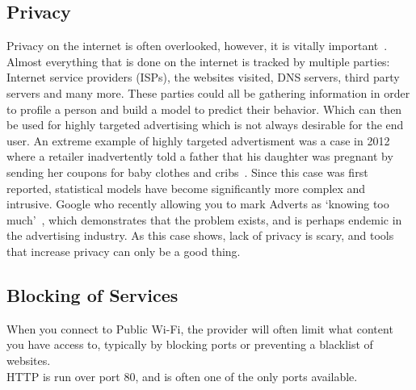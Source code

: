 \subsection{Privacy}
Privacy on the internet is often overlooked, however, it is vitally important~\cite{privacyrulez}. Almost everything that is done on the internet is tracked by multiple parties: Internet service providers (ISPs), the websites visited, DNS servers, third party servers and many more. These parties could all be gathering information in order to profile a person and build a model to predict their behavior. Which can then be used for highly targeted advertising which is not always desirable for the end user. An extreme example of highly targeted advertisment was a case in 2012 where a retailer inadvertently told a father that his daughter was pregnant by sending her coupons for baby clothes and cribs~\cite{babyshower}.
Since this case was first reported, statistical models have become significantly more complex and intrusive. Google who recently allowing you to mark Adverts as `knowing too much'~\cite{googlearewatching}, which demonstrates that the problem exists, and is perhaps endemic in the advertising industry.
As this case shows, lack of privacy is scary, and tools that increase privacy can only be a good thing.

\subsection{Blocking of Services}
When you connect to Public Wi-Fi, the provider will often limit what content you have access to, typically by blocking ports or preventing a blacklist of websites.\\
HTTP is run over port 80, and is often one of the only ports available.

